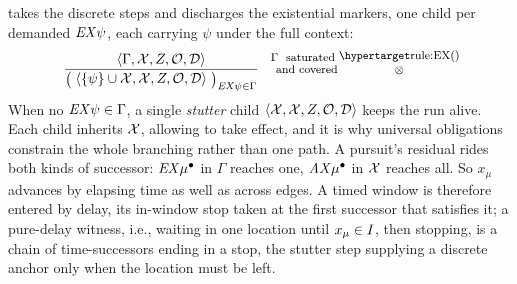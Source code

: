 
 takes the discrete steps and discharges the existential markers, one child per demanded
$\mathit{EX}\psi$, each carrying $\psi$ under the full context:
\vspace{-0.2cm}
\[
\footnotesize
\ \frac{\tup{\Gamma}{\Ctx}{Z}{\obligations}{\Deadline}}
{\big(\ \tup{\{\psi\}\cup\Ctx}{\Ctx}{Z}{\obligations}{\Deadline}\ \big)_{\EX\psi\in\Gamma}}
\quad  \shortstack{$\Gamma$ \text{ saturated }\\ \text { and covered}}
\shortstack{\ruleanchor{EX}\\ \ANDn }
\]
When no $\mathit{EX}\psi\in\Gamma$, a single \emph{stutter} child
$\langle \mathcal{X}, \mathcal{X}, Z, \mathcal{O}, \mathcal{D}\rangle$ keeps the run alive. Each child inherits $\mathcal{X}$, allowing  to take effect, and it is why universal obligations constrain the whole
branching rather than one path. A pursuit's residual rides both kinds of successor: $\mathit{EX}\mu^\bullet$ in $\Gamma$ reaches one, $\mathit{AX}\mu^\bullet$ in $\mathcal{X}$ reaches all. So $x_\mu$ advances by elapsing time as well as across edges.
A timed window is therefore entered by delay, its in-window stop taken at the first successor that
satisfies it; a pure-delay witness, i.e., waiting in one location until $x_\mu\in I$, then stopping, is a
chain of time-successors ending in a stop, the stutter step supplying a discrete anchor only when the
location must be left.




